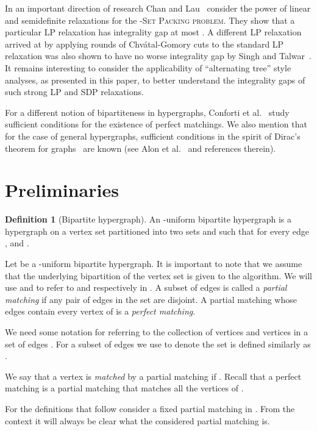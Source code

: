 \documentclass[11pt]{article}
\theoremstyle{definition}
\newtheorem{definition}[theorem]{Definition}
\theoremstyle{remark}
\newcommand{\problemmacro}[1]{\texorpdfstring{\textsc{#1}}{#1}\xspace}
\begin{document}
In an important direction of research Chan and
Lau~\cite{chan2012linear} consider the power of linear and
semidefinite relaxations for the \problemmacro{-Set Packing
  problem}. They show that a particular LP relaxation has integrality
gap at most . A different LP relaxation arrived at by
applying  rounds of Chv\'atal-Gomory cuts to the standard LP
relaxation was also shown to have no worse integrality gap by Singh
and Talwar~\cite{singh2010improving}. It remains interesting to
consider the applicability of ``alternating tree'' style analyses, as
presented in this paper, to better understand the integrality gaps of
such strong LP and SDP relaxations.

For a different notion of bipartiteness in hypergraphs, Conforti
et al.~\cite{conforti1996perfect} study sufficient conditions for the
existence of perfect matchings. We also mention that for the case of
general hypergraphs, sufficient conditions in the spirit of Dirac's
theorem for graphs~\cite{dirac1952some} are known (see Alon
et al.~\cite{alon2012large} and references therein).

\section{Preliminaries}\label{section:preliminaries}
\begin{definition}[Bipartite hypergraph]
  An -uniform bipartite hypergraph  is a hypergraph
  on a vertex set partitioned into two sets  and  such that for
  every edge ,  and .
\end{definition}

Let  be a -uniform bipartite hypergraph. It is important
to note that we assume that the underlying bipartition of the vertex set is given
to the algorithm. We will
use  and  to refer to  and  respectively in . A
subset of edges  is called a \textit{partial matching}
if any pair of edges in the set are disjoint. A partial matching whose
edges contain every vertex of  is a \textit{perfect matching}.

We need some notation for referring to the collection of  vertices
and  vertices in a set of edges . For a subset of
edges  we use  to denote the set
  is defined similarly as
.

We say that a vertex  is \textit{matched} by a partial
matching  if . Recall that a perfect matching is a
partial matching that matches all the vertices of .

For the definitions that follow consider a fixed partial matching
 in . From the context it will always be clear what the
considered partial matching is.
\end{document}

